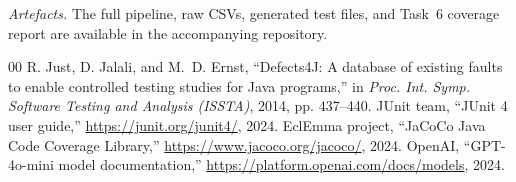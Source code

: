 \documentclass[conference]{IEEEtran}
\begin{document}
\bigskip
\noindent\textit{Artefacts.} The full pipeline, raw CSVs, generated
test files, and Task~6 coverage report are available in the
accompanying repository.

\begin{thebibliography}{00}
 R. Just, D. Jalali, and M.~D. Ernst, ``Defects4J: A
database of existing faults to enable controlled testing studies for
Java programs,'' in \textit{Proc. Int. Symp. Software Testing and
Analysis (ISSTA)}, 2014, pp. 437--440.
 JUnit team, ``JUnit 4 user guide,''
\url{https://junit.org/junit4/}, 2024.
 EclEmma project, ``JaCoCo Java Code Coverage
Library,'' \url{https://www.jacoco.org/jacoco/}, 2024.
 OpenAI, ``GPT-4o-mini model documentation,''
\url{https://platform.openai.com/docs/models}, 2024.
\end{thebibliography}
\end{document}
